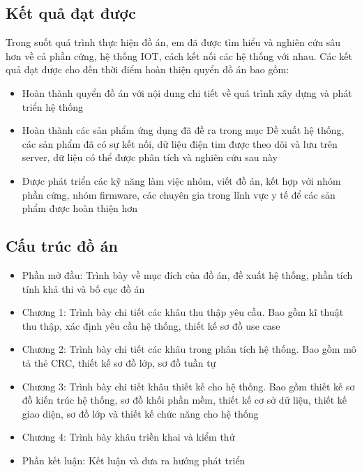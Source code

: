 \subsection*{Kết quả đạt được}

Trong suốt quá trình thực hiện đồ án, em đã được tìm hiểu và nghiên cứu sâu hơn về cả phần cứng,
hệ thống IOT, cách kết nối các hệ thống với nhau. Các kết quả đạt được cho đến thời điểm hoàn thiện quyển đồ án bao gồm:

\begin{adjustwidth}{1.5em}{}
  \begin{itemize}
      \item Hoàn thành quyển đồ án với nội dung chi tiết về quá trình xây dựng và phát triển hệ thống
      \item Hoàn thành các sản phẩm ứng dụng đã đề ra trong mục Đề xuất hệ thống, các sản phẩm đã có sự kết nối, dữ liệu điện tim được theo dõi
      và lưu trên server, dữ liệu có thể được phân tích và nghiên cứu sau này
      \item Được phát triển các kỹ năng làm việc nhóm, viết đồ án, kết hợp với nhóm phần cứng, nhóm firmware, các chuyên gia trong lĩnh vực y tế để các sản phẩm được hoàn thiện hơn
    \end{itemize}
  \end{adjustwidth}
\subsection*{Cấu trúc đồ án}

\begin{adjustwidth}{1.5em}{}
\begin{itemize}
  \item Phần mở đầu: Trình bày về mục đích của đồ án, đề xuất hệ thống, phần tích tính khả thi và bố cục đồ án
  \item Chương 1: Trình bày chi tiết các khâu thu thập yêu cầu. Bao gồm kĩ thuật thu thập, xác định yêu cầu hệ thống, thiết kế sơ đồ use case
  \item Chương 2: Trình bày chi tiết các khâu trong phân tích hệ thống. Bao gồm mô tả thẻ CRC, thiết kế sơ đồ lớp, sơ đồ tuần tự
  \item Chương 3: Trình bày chi tiết khâu thiết kế cho hệ thống. Bao gồm thiết kế sơ đồ kiến trúc hệ thống, sơ đồ khối
  phần mềm, thiết kế cơ sở dữ liệu, thiết kế giao diện, sơ đồ lớp và thiết kế chức năng cho hệ thống
  \item Chương 4: Trình bày khâu triền khai và kiểm thử
  \item Phần kết luận: Kết luận và đưa ra hướng phát triển 
\end{itemize}
\end{adjustwidth}

\cleardoublepage

